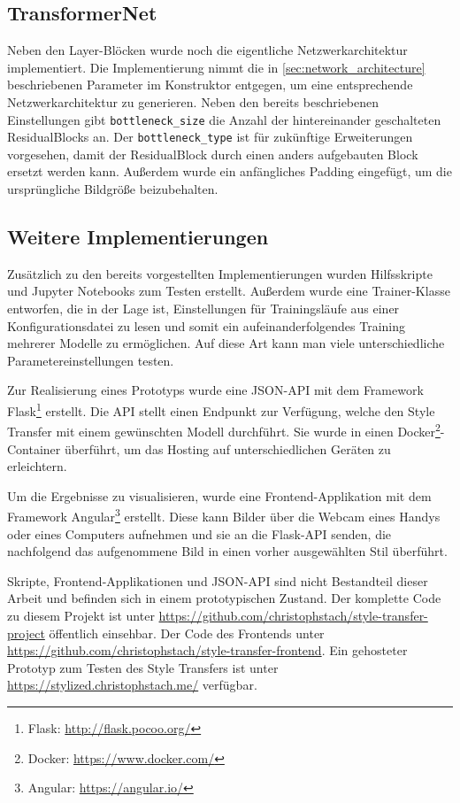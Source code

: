 \subsection{TransformerNet}

Neben den Layer-Blöcken wurde noch die eigentliche Netzwerkarchitektur implementiert. Die Implementierung nimmt die in \ref{sec:network_architecture} beschriebenen Parameter im Konstruktor entgegen, um eine entsprechende Netzwerkarchitektur zu generieren. Neben den bereits beschriebenen Einstellungen gibt \texttt{bottleneck_size} die Anzahl der hintereinander geschalteten ResidualBlocks an. Der \texttt{bottleneck_type} ist für zukünftige Erweiterungen vorgesehen, damit der ResidualBlock durch einen anders aufgebauten Block ersetzt werden kann. Außerdem wurde ein anfängliches Padding eingefügt, um die ursprüngliche Bildgröße beizubehalten.

\subsection{Weitere Implementierungen}

Zusätzlich zu den bereits vorgestellten Implementierungen wurden Hilfsskripte und Jupyter Notebooks zum Testen erstellt. Außerdem wurde eine Trainer-Klasse entworfen, die in der Lage ist, Einstellungen für Trainingsläufe aus einer Konfigurationsdatei zu lesen und somit 
ein aufeinanderfolgendes Training mehrerer Modelle zu ermöglichen. Auf diese Art kann man viele unterschiedliche Parametereinstellungen testen.

Zur Realisierung eines Prototyps wurde eine JSON-API mit dem Framework Flask\footnote{Flask: \url{http://flask.pocoo.org/}} erstellt. Die API stellt einen Endpunkt zur Verfügung, welche den Style Transfer mit einem gewünschten Modell durchführt. Sie wurde in einen Docker\footnote{Docker: \url{https://www.docker.com/}}-Container überführt, um das Hosting auf unterschiedlichen Geräten zu erleichtern.

Um die Ergebnisse zu visualisieren, wurde eine Frontend-Applikation mit dem Framework Angular\footnote{Angular: \url{https://angular.io/}} erstellt. Diese kann Bilder über die Webcam eines Handys oder eines Computers aufnehmen und sie an die Flask-API senden, die nachfolgend das aufgenommene Bild in einen vorher ausgewählten Stil überführt.

Skripte, Frontend-Applikationen und JSON-API sind nicht Bestandteil dieser Arbeit und befinden sich in einem prototypischen Zustand. Der komplette Code zu diesem Projekt ist unter \url{https://github.com/christophstach/style-transfer-project} öffentlich einsehbar. Der Code des Frontends unter \url{https://github.com/christophstach/style-transfer-frontend}. Ein gehosteter Prototyp zum Testen des Style Transfers ist unter \url{https://stylized.christophstach.me/} verfügbar.